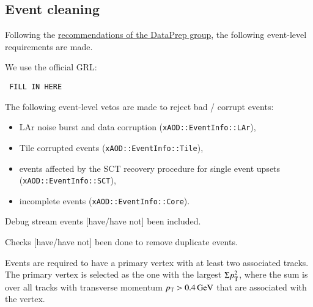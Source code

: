 \subsection{Event cleaning}
Following the \href{https://twiki.cern.ch/twiki/bin/viewauth/Atlas/DataPreparationCheckListForPhysicsAnalysis}{recommendations of the DataPrep group}, the following event-level requirements are made.

We use the official GRL\@:
 \begin{verbatim} FILL IN HERE \end{verbatim}
 
The following event-level vetos are made to reject bad / corrupt events:
 \begin{itemize}
  \item LAr noise burst and data corruption (\verb|xAOD::EventInfo::LAr|),
  \item Tile corrupted events (\verb|xAOD::EventInfo::Tile|),
  \item events affected by the SCT recovery procedure for single event upsets (\verb|xAOD::EventInfo::SCT|),
  \item incomplete events (\verb|xAOD::EventInfo::Core|).
 \end{itemize}
 
 Debug stream events [have/have not] been included.
 
 Checks [have/have not] been done to remove duplicate events.
 
Events are required to have a primary vertex with at least two associated tracks.
The primary vertex is selected as the one with the largest \(\Sigma p_{\text{T}}^2\),
where the sum is over all tracks with transverse momentum \(\pT > \qty{0.4}{\GeV}\) that are associated with the vertex.
 
 